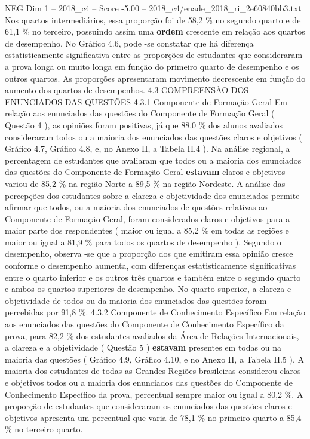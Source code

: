 \begin{textsample}{NEG Dim 1 – 2018\_c4 – Score -5.00 – 2018\_c4/enade\_2018\_ri\_2e60840bb3.txt}
Nos quartos intermediários, essa proporção foi de 58,2 \% no segundo quarto e de 61,1 \% no terceiro, possuindo assim uma \textbf{ordem} crescente em relação aos quartos de desempenho.
No Gráfico 4.6, pode -se constatar que há diferença estatisticamente significativa entre as proporções de estudantes que consideraram a prova longa ou muito longa em função do primeiro quarto de desempenho e os outros quartos.
As proporções apresentaram movimento decrescente em função do aumento dos quartos de desempenhos. 4.3 COMPREENSÃO DOS ENUNCIADOS DAS QUESTÕES 4.3.1 Componente de Formação Geral Em relação aos enunciados das questões do Componente de Formação Geral ( Questão 4 ), as opiniões foram positivas, já que 88,0 \% dos alunos avaliados consideraram todos ou a maioria dos enunciados das questões claros e objetivos ( Gráfico 4.7, Gráfico 4.8, e, no Anexo II, a Tabela II.4 ).
Na análise regional, a percentagem de estudantes que avaliaram que todos ou a maioria dos enunciados das questões do Componente de Formação Geral \textbf{estavam} claros e objetivos variou de 85,2 \% na região Norte a 89,5 \% na região Nordeste.
A análise das percepções dos estudantes sobre a clareza e objetividade dos enunciados permite afirmar que todos, ou a maioria dos enunciados de questões relativas ao Componente de Formação Geral, foram considerados claros e objetivos para a maior parte dos respondentes ( maior ou igual a 85,2 \% em todas as regiões e maior ou igual a 81,9 \% para todos os quartos de desempenho ).
Segundo o desempenho, observa -se que a proporção dos que emitiram essa opinião cresce conforme o desempenho aumenta, com diferenças estatisticamente significativas entre o quarto inferior e os outros três quartos e também entre o segundo quarto e ambos os quartos superiores de desempenho.
No quarto superior, a clareza e objetividade de todos ou da maioria dos enunciados das questões foram percebidas por 91,8 \%. 4.3.2 Componente de Conhecimento Específico Em relação aos enunciados das questões do Componente de Conhecimento Específico da prova, para 82,2 \% dos estudantes avaliados da Área de Relações Internacionais, a clareza e a objetividade ( Questão 5 ) \textbf{estavam} presentes em todas ou na maioria das questões ( Gráfico 4.9, Gráfico 4.10, e no Anexo II, a Tabela II.5 ).
A maioria dos estudantes de todas as Grandes Regiões brasileiras considerou claros e objetivos todos ou a maioria dos enunciados das questões do Componente de Conhecimento Específico da prova, percentual sempre maior ou igual a 80,2 \%.
A proporção de estudantes que consideraram os enunciados das questões claros e objetivos apresenta um percentual que varia de 78,1 \% no primeiro quarto a 85,4 \% no terceiro quarto.

\end{textsample}

